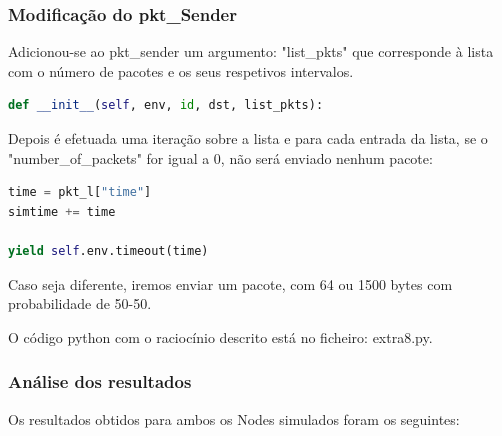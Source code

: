 \documentclass[pdftex,12pt,a4paper]{report}
\begin{document}
\subsubsection{Modificação do pkt\_Sender}

Adicionou-se ao pkt\_sender um argumento: "list\_pkts" que corresponde à lista com o número de pacotes e os seus respetivos intervalos.

\begin{lstlisting}[language=python]
def __init__(self, env, id, dst, list_pkts):
\end{lstlisting}

Depois é efetuada uma iteração sobre a lista e para cada entrada da lista, se o "number\_of\_packets" for igual a 0, não será enviado nenhum pacote:

\begin{lstlisting}[language=python]
time = pkt_l["time"]
simtime += time

yield self.env.timeout(time)
\end{lstlisting}

Caso seja diferente,  iremos enviar um pacote, com 64 ou 1500 bytes com probabilidade de 50-50.

O código python com o raciocínio descrito está no ficheiro: extra8.py.

\subsubsection{Análise dos resultados}

Os resultados obtidos para ambos os Nodes simulados foram os seguintes:

\begin{table}[!htb]
\centering
{}
\caption{Valores teóricos e simulados do atraso e da probabilidade de perda de pacotes no Node 1}
\end{table}
\end{document}
